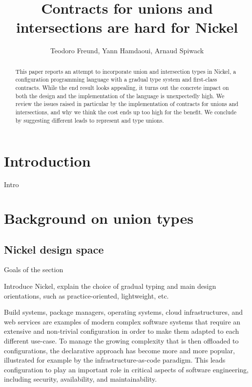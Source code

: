 \documentclass{article}
\title{Contracts for unions and intersections are hard for Nickel}
\author{Teodoro Freund, Yann Hamdaoui, Arnaud Spiwack}
\newcommand{\unsure}[2][1=]{}
\newcommand{\info}[2][1=]{}
\begin{document}
\maketitle

\begin{abstract}
This paper reports an attempt to incorporate union and intersection types in
Nickel, a configuration programming language with a gradual type system and
first-class contracts. While the end result looks appealing, it turns out the
concrete impact on both the design and the implementation of the language is
unexpectedly high. We review the issues raised in particular by the
implementation of contracts for unions and intersections, and why we think the
cost ends up too high for the benefit. We conclude by suggesting different leads
to represent and type unions.
\end{abstract}

\section*{Introduction}
Intro\unsure{todo}
\info{Goals of the paper: position paper: unions/intersections nice in
theory problematic in practice. In particular non-orthogonal with the
rest of the features of your language.}
\section{Background on union types}

\subsection{Nickel design space}

{\color{red}Goals of the section

Introduce Nickel, explain the choice of gradual
typing and main design orientations, such as practice-oriented, lightweight,
etc.\vspace{0.5cm}}

Build systems, package managers, operating systems, cloud infrastructures, and
web services are examples of modern complex software systems that require an
extensive and non-trivial configuration in order to make them adapted to each
different use-case. To manage the growing complexity that is then offloaded to
configurations, the declarative approach has become more and more popular,
illustrated for example by the infrastructure-as-code paradigm. This leads
configuration to play an important role in critical aspects of software
engineering, including security, availability, and maintainability.
\end{document}
